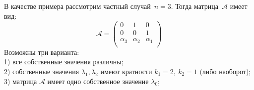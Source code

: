 В качестве примера рассмотрим частный случай~$n=3$. Тогда матрица~$\mathcal{A}$ имеет вид:
$$
 \mathcal{A} = 
 \begin{pmatrix}
  0 & 1 & 0\\
  0 & 0 & 1 \\
  \alpha_3 & \alpha_2 & \alpha_1 \\
 \end{pmatrix}
$$
Возможны три варианта: \\
1) все собственные значения различны; \\
2) собственные значения $\lambda_1, \lambda_2$ имеют кратности ${k_1=2},~{k_2=1}$ (либо наоборот); \\
3) матрица $\mathcal{A}$ имеет одно собственное значение $\lambda_0$;        

